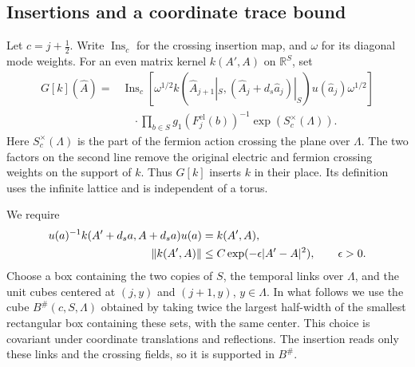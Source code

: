 \documentclass[11pt,letterpaper,reqno]{amsart}
\newcommand{\R}{\mathbb R}
\begin{document}
\subsection{Insertions and a coordinate trace bound}\label{subsec:diag-insertions}

Let $c=j+\tfrac12$. Write $\operatorname{Ins}_c$ for the crossing
insertion map, and $\omega$ for its diagonal mode weights. For an
even matrix kernel $k(A',A)$ on $\R^S$, set
\begin{equation}\label{eq:diag-kernel-insertion}
 \begin{split}
 G[k](\widehat A)={}&\operatorname{Ins}_c\!\left[
   \omega^{1/2}k(\widehat A_{j+1}|_S,
           (\widehat A_j+d_s\widehat a_j)|_S)
             u(\widehat a_j)\omega^{1/2}\right]\\
 &\quad\cdot\prod_{b\in S}g_1(F_j^{\mathrm{el}}(b))^{-1}
                      \exp(S_c^\times(\Lambda)).
 \end{split}
\end{equation}
Here $S_c^\times(\Lambda)$ is the part of the fermion action crossing
the plane over $\Lambda$. The two factors on the second line remove
the original electric and fermion crossing weights on the support
of $k$. Thus $G[k]$ inserts $k$ in their place. Its definition uses
the infinite lattice and is independent of a torus.

We require
\begin{align}\label{eq:diag-kernel-conditions}
 u(a)^{-1}k(A'+d_sa,A+d_sa)u(a)&=k(A',A),\notag\\
 \|k(A',A)\|&\le C\exp(-\epsilon|A'-A|^2),\qquad\epsilon>0.
\end{align}
Choose a box containing the two copies of $S$, the temporal links
over $\Lambda$, and the unit cubes centered at $(j,y)$ and $(j+1,y)$,
$y\in\Lambda$. In what follows we use the cube $B^\#(c,S,\Lambda)$
obtained by taking twice the largest half-width of the smallest
rectangular box containing these sets, with the same center. This
choice is covariant under coordinate translations and reflections.
The insertion reads only these links and the crossing fields, so
it is supported in $B^\#$.
\end{document}
